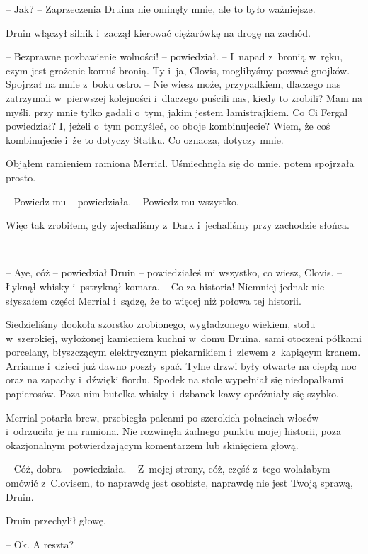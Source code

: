 \documentclass[oneside,polish,11pt,sfheadings]{mwbk}
\begin{document}
-- Jak? -- Zaprzeczenia Druina nie ominęły mnie, ale to było ważniejsze.

Druin włączył silnik i~zaczął kierować ciężarówkę na drogę na zachód. 

-- Bezprawne pozbawienie wolności! -- powiedział. -- I~napad z~bronią w~ręku,
czym jest grożenie komuś bronią. Ty i~ja, Clovis, moglibyśmy pozwać
gnojków. -- Spojrzał na mnie z~boku ostro. -- Nie wiesz może, przypadkiem,
dlaczego nas zatrzymali w~pierwszej kolejności i~dlaczego puścili nas,
kiedy to zrobili? Mam na myśli, przy mnie tylko gadali o~tym, jakim
jestem łamistrajkiem. Co Ci Fergal powiedział? I, jeżeli o~tym pomyśleć,
co oboje kombinujecie? Wiem, że coś kombinujecie i~że to dotyczy Statku.
Co oznacza, dotyczy mnie.

Objąłem ramieniem ramiona Merrial. Uśmiechnęła się do mnie, potem
spojrzała prosto.

-- Powiedz mu -- powiedziała. -- Powiedz mu wszystko.

Więc tak zrobiłem, gdy zjechaliśmy z~Dark i~jechaliśmy przy zachodzie
słońca.

~

-- Aye, cóż -- powiedział Druin -- powiedziałeś mi wszystko, co wiesz,
Clovis. -- Łyknął whisky i~pstryknął komara. -- Co za historia! Niemniej
jednak nie słyszałem części Merrial i~sądzę, że to więcej niż połowa tej
historii.

Siedzieliśmy dookoła szorstko zrobionego, wygładzonego wiekiem, stołu w~szerokiej, wyłożonej kamieniem kuchni w~domu Druina, sami otoczeni
półkami porcelany, błyszczącym elektrycznym piekarnikiem i~zlewem z~kapiącym kranem. Arrianne i~dzieci już dawno poszły spać. Tylne drzwi
były otwarte na ciepłą noc oraz na zapachy i~dźwięki fiordu. Spodek na
stole wypełniał się niedopałkami papierosów. Poza nim butelka whisky i~dzbanek kawy opróżniały się szybko.

Merrial potarła brew, przebiegła palcami po szerokich połaciach włosów i~odrzuciła je na ramiona. Nie rozwinęła żadnego punktu mojej historii,
poza okazjonalnym potwierdzającym komentarzem lub skinięciem głową.

-- Cóż, dobra -- powiedziała. -- Z~mojej strony, cóż, część z~tego
wolałabym omówić z~Clovisem, to naprawdę jest osobiste, naprawdę nie
jest Twoją sprawą, Druin.

Druin przechylił głowę. 

-- Ok. A reszta?
\end{document}
